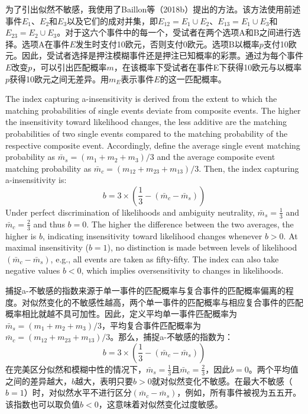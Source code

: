 \documentclass[12pt,a4paper]{article}
\newenvironment{original}
  {\par\medskip\noindent\color{black}\ignorespaces}
  {\par\medskip}
\newenvironment{translation}
  {\par\noindent\color{transblue}\ignorespaces}
  {\par\medskip\medskip}
\begin{document}
\begin{translation}
为了引出似然不敏感，我使用了Baillon等（2018b）提出的方法。该方法使用前述事件$E_1$、$E_2$和$E_3$以及它们的成对并集，即$E_{12} = E_1 \cup E_2$、$E_{13} = E_1 \cup E_3$和$E_{23} = E_2 \cup E_3$。对于这六个事件中的每一个，受试者在两个选项A和B之间进行选择。选项A在事件$E$发生时支付10欧元，否则支付0欧元。选项B以概率$p$支付10欧元。因此，受试者选择是押注模糊事件还是押注已知概率的彩票。通过为每个事件$E$改变$p$，可以引出匹配概率$m$，在该概率下受试者在事件E下获得10欧元与以概率$p$获得10欧元之间无差异。用$m_E$表示事件$E$的这一匹配概率。
\end{translation}

\begin{original}
The index capturing a-insensitivity is derived from the extent to which the matching probabilities of single events deviate from composite events. The higher the insensitivity toward likelihood changes, the less additive are the matching probabilities of two single events compared to the matching probability of the respective composite event. Accordingly, define the average single event matching probability as $\bar{m}_s = (m_1 + m_2 + m_3)/3$ and the average composite event matching probability as $\bar{m}_c = (m_{12} + m_{23} + m_{13})/3$. Then, the index capturing a-insensitivity is:
\begin{equation}
b = 3 \times \left(\frac{1}{3} - (\bar{m}_c - \bar{m}_s)\right) \label{eq:6}
\end{equation}
Under perfect discrimination of likelihoods and ambiguity neutrality, $\bar{m}_s = \frac{1}{3}$ and $\bar{m}_c = \frac{2}{3}$ and thus $b = 0$. The higher the difference between the two averages, the higher is $b$, indicating insensitivity toward likelihood changes whenever $b > 0$. At maximal insensitivity ($b = 1$), no distinction is made between levels of likelihood $(\bar{m}_c - \bar{m}_s)$, e.g., all events are taken as fifty-fifty. The index can also take negative values $b < 0$, which implies oversensitivity to changes in likelihoods.
\end{original}

\begin{translation}
捕捉a-不敏感的指数来源于单一事件的匹配概率与复合事件的匹配概率偏离的程度。对似然变化的不敏感性越高，两个单一事件的匹配概率与相应复合事件的匹配概率相比就越不具可加性。因此，定义平均单一事件匹配概率为$\bar{m}_s = (m_1 + m_2 + m_3)/3$，平均复合事件匹配概率为$\bar{m}_c = (m_{12} + m_{23} + m_{13})/3$。那么，捕捉a-不敏感的指数为：
\begin{equation}
b = 3 \times \left(\frac{1}{3} - (\bar{m}_c - \bar{m}_s)\right)
\end{equation}
在完美区分似然和模糊中性的情况下，$\bar{m}_s = \frac{1}{3}$且$\bar{m}_c = \frac{2}{3}$，因此$b = 0$。两个平均值之间的差异越大，$b$越大，表明只要$b > 0$就对似然变化不敏感。在最大不敏感（$b = 1$）时，对似然水平不进行区分$(\bar{m}_c - \bar{m}_s)$，例如，所有事件被视为五五开。该指数也可以取负值$b < 0$，这意味着对似然变化过度敏感。
\end{translation}
\end{document}
